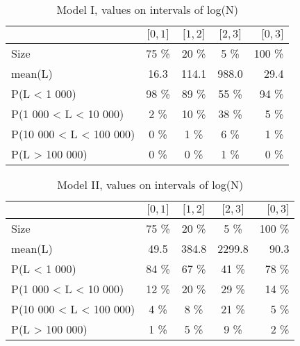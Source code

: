 \documentclass[numbered]{CSL}
\begin{document}
\setlength{\tabcolsep}{0.5em}
\begin{table}
\centering
\caption{Model I, values on intervals of log(N) \label{table:NModelI}}
\begin{tabular}{l|ccc|r}
\toprule
{} & \small{$\lbrack 0, 1 \rbrack$} & \small{$\lbrack 1, 2 \rbrack$} & \small{$\lbrack 2, 3 \rbrack$} & \small{$\lbrack 0, 3 \rbrack$} \\
\midrule
Size                    &               75 \% &               20 \% &                5 \% &              100 \% \\
mean(L)                 &               16.3 &              114.1 &              988.0 &               29.4 \\
P(L < 1 000)            &               98 \% &               89 \% &               55 \% &               94 \% \\
P(1 000 < L < 10 000)   &                2 \% &               10 \% &               38 \% &                5 \% \\
P(10 000 < L < 100 000) &                0 \% &                1 \% &                6 \% &                1 \% \\
P(L > 100 000)          &                0 \% &                0 \% &                1 \% &                0 \% \\
\bottomrule
\end{tabular}
\end{table}

\setlength{\tabcolsep}{0.5em}
\begin{table}
\centering
\caption{Model II, values on intervals of log(N) \label{table:NModelII}}
\begin{tabular}{l|ccc|r}
\toprule
{} & \small{$\lbrack 0, 1 \rbrack$} & \small{$\lbrack 1, 2 \rbrack$} & \small{$\lbrack 2, 3 \rbrack$} & \small{$\lbrack 0, 3 \rbrack$} \\
\midrule
Size                    &               75 \% &               20 \% &                5 \% &              100 \% \\
mean(L)                 &               49.5 &              384.8 &             2299.8 &               90.3 \\
P(L < 1 000)            &               84 \% &               67 \% &               41 \% &               78 \% \\
P(1 000 < L < 10 000)   &               12 \% &               20 \% &               29 \% &               14 \% \\
P(10 000 < L < 100 000) &                4 \% &                8 \% &               21 \% &                5 \% \\
P(L > 100 000)          &                1 \% &                5 \% &                9 \% &                2 \% \\
\bottomrule
\end{tabular}
\end{table}
\end{document}

